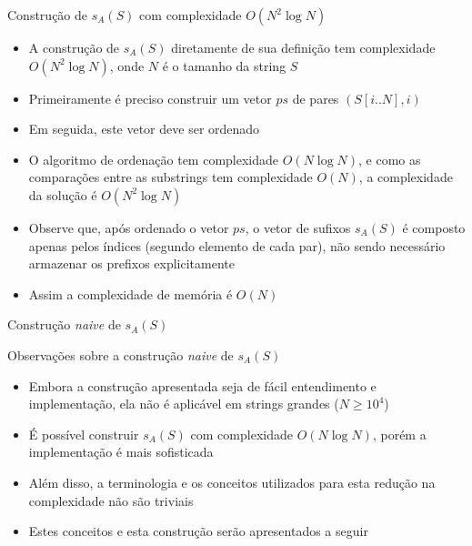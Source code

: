 \begin{frame}[fragile]{Construção de $s_A(S)$ com complexidade $O(N^2\log N)$}

    \begin{itemize}
        \item A construção de $s_A(S)$ diretamente de sua definição tem complexidade 
            $O(N^2\log N)$, onde $N$ é o tamanho da string $S$

        \item Primeiramente é preciso construir um vetor $ps$ de pares $(S[i..N], i)$

        \item Em seguida, este vetor deve ser ordenado

        \item O algoritmo de ordenação tem complexidade $O(N\log N)$, e como as comparações
            entre as substrings tem complexidade $O(N)$, a complexidade da solução é
            $O(N^2\log N)$

        \item Observe que, após ordenado o vetor $ps$, o vetor de sufixos $s_A(S)$ é composto apenas
            pelos índices (segundo elemento de cada par), não sendo necessário armazenar os
            prefixos explicitamente

        \item Assim a complexidade de memória é $O(N)$
            
    \end{itemize}

\end{frame}

\begin{frame}[fragile]{Construção {\it naive} de $s_A(S)$}
\end{frame}

\begin{frame}[fragile]{Observações sobre a construção {\it naive} de $s_A(S)$}

    \begin{itemize}
        \item Embora a construção apresentada seja de fácil entendimento e implementação,
            ela não é aplicável em strings grandes ($N \geq 10^4$)

        \item É possível construir $s_A(S)$ com complexidade $O(N\log N)$, porém a 
            implementação é mais sofisticada

        \item Além disso, a terminologia e os conceitos utilizados para esta redução na 
            complexidade não são triviais

        \item Estes conceitos e esta construção serão apresentados a seguir
    \end{itemize}

\end{frame}
